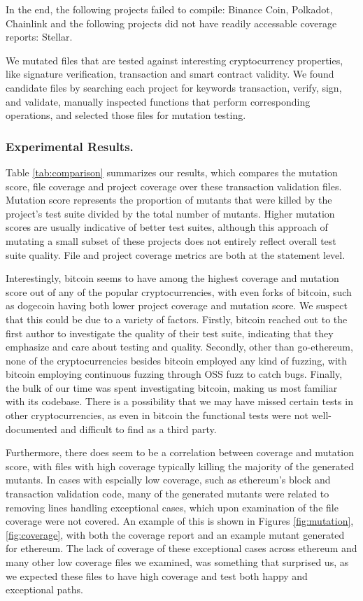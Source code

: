 In the end, the following projects failed to compile: Binance Coin, Polkadot, Chainlink and the following projects did not have
readily accessable coverage reports: Stellar.

We mutated files that are tested against interesting cryptocurrency properties, like signature verification, transaction and smart contract validity.
We found candidate files by searching each project for keywords transaction, verify, sign, and validate, manually inspected functions that perform corresponding operations,
and selected those files for mutation testing.



\subsubsection*{Experimental Results.}
Table \ref{tab:comparison} summarizes our results, which compares the mutation score, file coverage and project coverage over these transaction validation files. Mutation score represents the proportion
of mutants that were killed by the project's test suite divided by the total number of mutants. Higher mutation scores are usually indicative of better test suites, although this approach
of mutating a small subset of these projects does not entirely reflect overall test suite quality. File and project coverage metrics are both at the statement level.

 Interestingly, bitcoin seems to have among the highest coverage and mutation score out of any of the popular cryptocurrencies, with even forks of bitcoin, such as dogecoin having both lower
project coverage and mutation score. We suspect that this could be due to a variety of factors. Firstly, bitcoin reached out to the first author to investigate the quality of their test suite,
indicating that they emphasize and care about testing and quality. Secondly, other than go-ethereum, none of the cryptocurrencies besides bitcoin employed any kind of fuzzing, with bitcoin
employing continuous fuzzing through OSS fuzz to catch bugs. Finally, the bulk of our time was spent investigating bitcoin, making us most familiar with its codebase. There is a possibility
that we may have missed certain tests in other cryptocurrencies, as even in bitcoin the functional tests were not well-documented and difficult to find as a third party.

Furthermore, there does seem to be a correlation between coverage and mutation score, with files with high coverage typically killing the majority of the generated mutants. In cases with espcially
low coverage, such as ethereum's block and transaction validation code, many of the generated mutants were related to removing lines handling exceptional cases, which upon examination of the
file coverage were not covered. An example of this is shown in Figures \ref{fig:mutation}, \ref{fig:coverage}, with both the coverage report and an example mutant generated for ethereum.
The lack of coverage of these exceptional cases across ethereum and many other low coverage files we examined, was something that surprised us, as we expected these files to have high coverage
and test both happy and exceptional paths.

